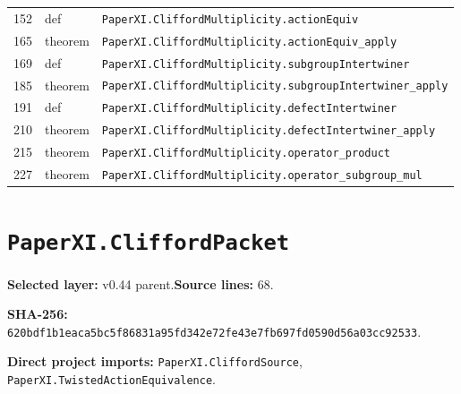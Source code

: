 \documentclass[10pt,oneside]{book}
\begin{document}
\begin{longtable}{@{}p{}p{}p{}@{}}
152&def&\nolinkurl{PaperXI.CliffordMultiplicity.actionEquiv}\\

165&theorem&\nolinkurl{PaperXI.CliffordMultiplicity.actionEquiv_apply}\\

169&def&\nolinkurl{PaperXI.CliffordMultiplicity.subgroupIntertwiner}\\

185&theorem&\nolinkurl{PaperXI.CliffordMultiplicity.subgroupIntertwiner_apply}\\

191&def&\nolinkurl{PaperXI.CliffordMultiplicity.defectIntertwiner}\\

210&theorem&\nolinkurl{PaperXI.CliffordMultiplicity.defectIntertwiner_apply}\\

215&theorem&\nolinkurl{PaperXI.CliffordMultiplicity.operator_product}\\

227&theorem&\nolinkurl{PaperXI.CliffordMultiplicity.operator_subgroup_mul}\\

\bottomrule\end{longtable}

\section{\texorpdfstring{\nolinkurl{PaperXI.CliffordPacket}}{PaperXI.CliffordPacket}}\label{module:PaperXI.CliffordPacket}

\textbf{Selected layer:} v0.44 parent.\quad\textbf{Source lines:} 68.\par\textbf{SHA-256:} {\scriptsize\nolinkurl{620bdf1b1eaca5bc5f86831a95fd342e72fe43e7fb697fd0590d56a03cc92533}}.


\textbf{Direct project imports:} \nolinkurl{PaperXI.CliffordSource}, \nolinkurl{PaperXI.TwistedActionEquivalence}.
\end{document}
